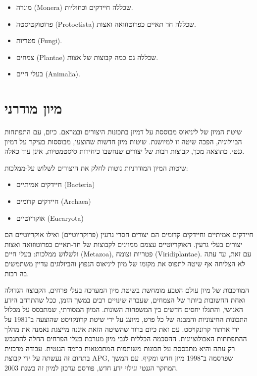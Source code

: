 \documentclass{article}
\begin{document}
\begin{itemize}
  \item מונרה (Monera) שכללה חיידקים וכחוליות.
  \item פרוטוקטיסטה (Protoctista) שכללה חד תאיים כפרוטוזואה ואצות.
  \item פטריות (Fungi).
  \item צמחים (Plantae) שכללה גם כמה קבוצות של אצות.
  \item בעלי חיים (Animalia).
\end{itemize}

\section{מיון מודרני}

שיטת המיון של ליניאוס מבוססת על דמיון בתכונות היצורים ובמראם. כיום, עם
התפתחות הביולוגיה, הפכה שיטה זו למיושנת. שיטות מיון חדשות שהוצעו,
מבוססות בעיקר על דמיון גנטי. כתוצאה מכך, קבוצות רבות של יצורים שנחשבו
כיחידות סיסטמטיות, אינן עוד כאלה.

שיטות המיון המודרניות נוטות לחלק את היצורים לשלוש על-ממלכות:

\begin{itemize}
  \item חיידקים אמיתיים (Bacteria)
  \item חיידקים קדומים (Archaea)
  \item אוקריוטיים (Eucaryota)
\end{itemize}

חיידקים אמיתיים וחיידקים קדומים הם יצורים חסרי גרעין (פרוקריוטיים)
ואילו אוקריוטיים הם יצורים בעלי גרעין. האוקריוטיים עצמם ממוינים לקבוצות
של חד-תאיים כפרוטוזואה ואצות ולשלוש ממלכות: בעלי חיים (Metazoa), פטריות
וצומח (Viridiplantae). עם זאת, עד עתה לא הצליחה אף שיטה לתפוס את מקומו
של מיון ליניאוס הנפוץ והביולוגים עדיין משתמשים בה רבות.

המורכבות של מיון עולם הטבע מומחשת בשיטת מיון המערכה בעלי פרחים, הקבוצה
הגדולה ואחת החשובות ביותר של הצמחים, שעברה שינויים רבים במשך הזמן, ככל
שהתרחב הידע האנושי, והתגלו יחסים חדשים בין המשפחות השונות. המיון
המסורתי, שמתבסס על מכלול התכונות החיצוניות והמבנה של כל פרט, מיוצג על
ידי שיטת קרונקויסט שהוצעה ב־1981 על ידי ארתור קרונקויסט. עם זאת כיום
ברור שהשיטה הזאת איננה מייצגת נאמנה את מהלך ההתפתחות האבולוציונית.
ההסכמה הכללית לגבי מיון מערכת בעלי הפרחים החלה להתגבש רק עתה והיא
מתבססת על תכונות משותפות המתבטאות ברמה הגנטית. עבודה מרכזית בתחום זה
נעשתה על ידי קבוצת APG, שפרסמה ב־1998 מיון חדש ומקיף. עם המשך המחקר
הגנטי וגילוי ידע חדש, פורסם עדכון למיון זה בשנת 2003.
\end{document}
